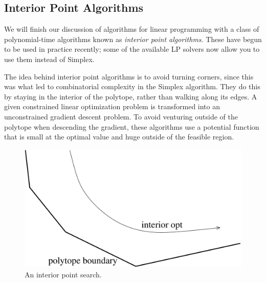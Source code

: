 \documentclass{article}
\begin{document}
\subsection{Interior Point Algorithms}

We will finish our discussion of algorithms for linear programming
with a class of polynomial-time algorithms known as \textit{interior
point algorithms}.  These have begun to be used in practice recently;
some of the available LP solvers now allow you to use them instead of
Simplex.

The idea behind interior point algorithms is to avoid turning corners,
since this was what led to combinatorial complexity in the Simplex
algorithm.  They do this by staying in the interior of the polytope,
rather than walking along its edges.  A given constrained linear
optimization problem is transformed into an unconstrained gradient
descent problem.  To avoid venturing outside of the polytope when
descending the gradient, these algorithms use a potential function
that is small at the optimal value and huge outside of the feasible
region.

\begin{figure}[h]
\begin{center}
  \includegraphics{lp-1.png}
  \caption{An interior point search.}
  \label{fig:interiorpt}
\end{center}
\end{figure}
\end{document}
